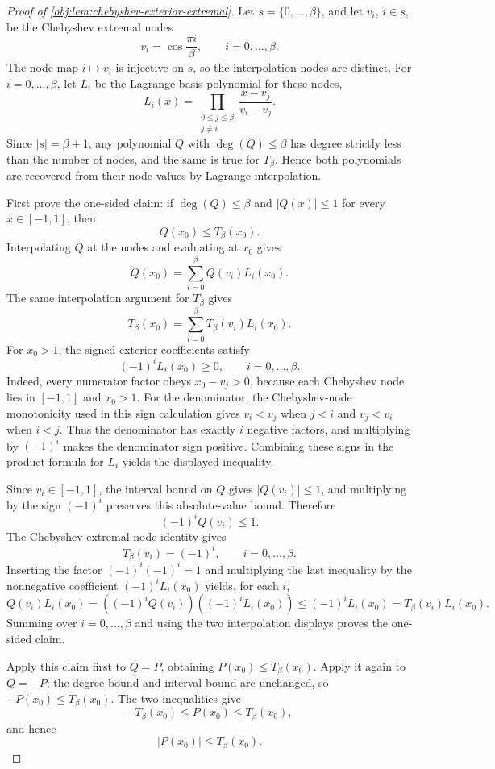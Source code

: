 \begin{proof}[Proof of \cref{obj:lem:chebyshev-exterior-extremal}]
Let \(s=\{0,\ldots,\beta\}\), and let \(v_i\), \(i\in s\), be the Chebyshev extremal nodes
\[
v_i=\cos\frac{\pi i}{\beta},
\qquad i=0,\ldots,\beta .
\]
The node map \(i\mapsto v_i\) is injective on \(s\), so the interpolation nodes are distinct. %
For \(i=0,\ldots,\beta\), let \(L_i\) be the Lagrange basis polynomial for these nodes,
\[
L_i(x)=\prod_{\substack{0\le j\le\beta\\ j\ne i}}\frac{x-v_j}{v_i-v_j}.
\]
Since \(|s|=\beta+1\), any polynomial \(Q\) with \(\deg(Q)\le\beta\) has degree strictly less than the number of nodes, and the same is true for \(T_\beta\). Hence both polynomials are recovered from their node values by Lagrange interpolation.

First prove the one-sided claim: if \(\deg(Q)\le\beta\) and \(|Q(x)|\le1\) for every \(x\in[-1,1]\), then
\[
Q(x_0)\le T_\beta(x_0).
\]
Interpolating \(Q\) at the nodes and evaluating at \(x_0\) gives
\[
Q(x_0)=\sum_{i=0}^{\beta}Q(v_i)L_i(x_0).
\] %
The same interpolation argument for \(T_\beta\) gives
\[
T_\beta(x_0)=\sum_{i=0}^{\beta}T_\beta(v_i)L_i(x_0).
\] %
For \(x_0>1\), the signed exterior coefficients satisfy
\[
(-1)^iL_i(x_0)\ge0,
\qquad i=0,\ldots,\beta .
\]
Indeed, every numerator factor obeys \(x_0-v_j>0\), because each Chebyshev node lies in \([-1,1]\) and \(x_0>1\). For the denominator, the Chebyshev-node monotonicity used in this sign calculation gives \(v_i<v_j\) when \(j<i\) and \(v_j<v_i\) when \(i<j\). Thus the denominator has exactly \(i\) negative factors, and multiplying by \((-1)^i\) makes the denominator sign positive. Combining these signs in the product formula for \(L_i\) yields the displayed inequality. %

Since \(v_i\in[-1,1]\), the interval bound on \(Q\) gives \(|Q(v_i)|\le1\), and multiplying by the sign \((-1)^i\) preserves this absolute-value bound. Therefore
\[
(-1)^iQ(v_i)\le1.
\] %
The Chebyshev extremal-node identity gives
\[
T_\beta(v_i)=(-1)^i,
\qquad i=0,\ldots,\beta .
\] %
Inserting the factor \((-1)^i(-1)^i=1\) and multiplying the last inequality by the nonnegative coefficient \((-1)^iL_i(x_0)\) yields, for each \(i\),
\[
Q(v_i)L_i(x_0)
=
\left((-1)^iQ(v_i)\right)\left((-1)^iL_i(x_0)\right)
\le
(-1)^iL_i(x_0)
=
T_\beta(v_i)L_i(x_0).
\]
Summing over \(i=0,\ldots,\beta\) and using the two interpolation displays proves the one-sided claim. %

Apply this claim first to \(Q=P\), obtaining \(P(x_0)\le T_\beta(x_0)\). Apply it again to \(Q=-P\); the degree bound and interval bound are unchanged, so \(-P(x_0)\le T_\beta(x_0)\). %
The two inequalities give
\[
-T_\beta(x_0)\le P(x_0)\le T_\beta(x_0),
\]
and hence
\[
|P(x_0)|\le T_\beta(x_0).
\] %
\end{proof}
